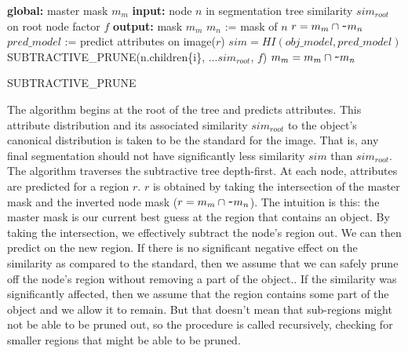 \documentclass[10pt,twocolumn,letterpaper]{article}
\begin{document}
\begin{algorithm}
\begin{algorithmic}
  \STATE \textbf{global:}
  \STATE \hspace{3 mm} master mask $m_m$
  \STATE \textbf{input:}
  \STATE \hspace{3 mm} node $n$ in segmentation tree
  \STATE \hspace{3 mm} similarity $sim_{root}$ on root node
  \STATE \hspace{3 mm} factor $f$
  \STATE \textbf{output:}
  \STATE \hspace{3 mm} mask $m_m$
  \STATE
  \STATE $m_n$ := mask of $n$
  \STATE $r = m_{m} \cap \verb+~+ m_{n}$
  \STATE $pred\_model$ := predict attributes on image($r$)
  \STATE $sim=HI(obj\_model,pred\_model)$
      \STATE SUBTRACTIVE\_PRUNE(n.children\{i\},
      \STATE ...$sim_{root}$, $f$)
    \ENDFOR
  \ELSE
    \STATE $m_m = m_m \cap \verb+~+ m_n$
  \ENDIF
\end{algorithmic}
\caption{SUBTRACTIVE\_PRUNE}
\label{alg:sub_prune}
\end{algorithm}

The algorithm begins at the root of the tree and predicts attributes.
This attribute distribution and its associated similarity $sim_{root}$
to the object's canonical distribution is taken to be
the standard for the image.  That is, any final segmentation should not have
significantly less similarity $sim$ than $sim_{root}$.  The algorithm traverses
the subtractive tree depth-first.  At each node, attributes are predicted for 
a region $r$.  
$r$ is obtained by taking the intersection of the master mask and the inverted
node mask ($r = m_{m} \cap \verb+~+ m_{n}$).  The intuition is this: the master mask is our current best guess at
the region that contains an object.  By taking the intersection, we effectively
subtract the node's region out.
We can then predict on the new region.  If 
there is no significant negative effect on the similarity as
compared to the standard, then we assume that we can safely prune off the node's
region without removing a part of the object..  If the
similarity was significantly affected, then we assume that the region
contains some part of the object and we allow it to remain.  But that 
doesn't mean that sub-regions might not be able to be pruned
out, so the procedure is called recursively, checking for smaller regions
that might be able to be pruned.
\end{document}
